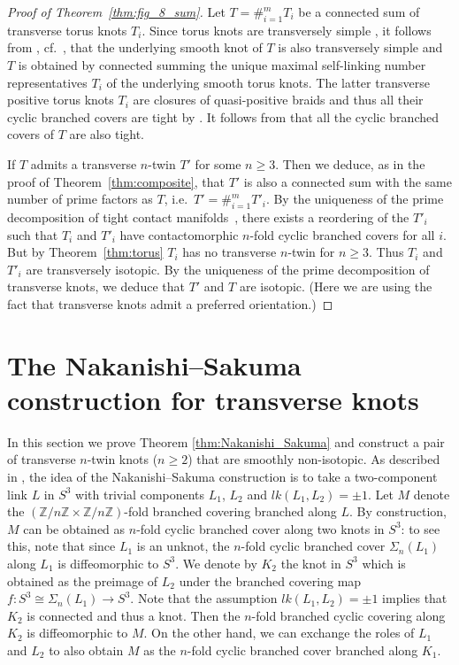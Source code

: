 \documentclass[11pt]{amsart}
\theoremstyle{definition}
\theoremstyle{definition}
\theoremstyle{definition}
\theoremstyle{definition}
\begin{document}
\begin{proof}[Proof of Theorem~\ref{thm:fig_8_sum}]
Let $T=\#_{i=1}^m T_i$ be a connected sum of transverse torus knots $T_i$.
Since torus knots are transversely simple \cite{Etnyre_torus_knots}, it follows from \cite{Etnyre_Honda_sum}, cf.\ \cite{An}, that the underlying smooth knot of $T$ is also transversely simple and $T$ is obtained by connected summing the unique maximal self-linking number representatives $T_i$ of the underlying smooth torus knots. The latter transverse positive torus knots $T_i$ are closures of quasi-positive braids and thus all their cyclic branched covers are tight by \cite{Harvey_br_covers}. It follows from \cite{Colin} that all the cyclic branched covers of $T$ are also tight.

If $T$ admits a transverse $n$-twin $T'$ for some $n\geq3$. Then we deduce, as in the proof of Theorem~\ref{thm:composite}, that $T'$ is also a connected sum with the same number of prime factors as $T$, i.e.\ $T'=\#_{i=1}^m T'_i$. By the uniqueness of the prime decomposition of tight contact manifolds~\cite{Geiges}, there exists a reordering of the $T'_i$ such that $T_i$ and $T'_i$ have contactomorphic $n$-fold cyclic branched covers for all $i$. But by Theorem~\ref{thm:torus} $T_i$ has no transverse $n$-twin for $n\geq3$. Thus $T_i$ and $T'_i$ are transversely isotopic. By the uniqueness of the prime decomposition of transverse knots, we deduce that $T'$ and $T$ are isotopic. (Here we are using the fact that transverse knots admit a preferred orientation.)
\end{proof}

\section{The Nakanishi--Sakuma construction for transverse knots}
In this section we prove Theorem \ref{thm:Nakanishi_Sakuma} and construct a pair of transverse $n$-twin knots ($n\ge 2$) that are smoothly non-isotopic.
As described in \cite{Paoluzzi_survey}, the idea of the Nakanishi--Sakuma construction \cite{nakanishi,sakuma} is to take a two-component link $L $ in $ S^3$ with trivial components $L_1$, $L_2$ and $lk(L_1,L_2)=\pm1$. Let $M$ denote the $(\mathbb{Z}/n\mathbb{Z}\times \mathbb{Z}/n\mathbb{Z})$-fold branched covering branched along $L$. By construction, $M$ can be obtained as $n$-fold cyclic branched cover along two knots in $S^3$: to see this, note that since $L_1$ is an unknot, the $n$-fold cyclic branched cover $\Sigma_n(L_1)$ along $L_1$ is diffeomorphic to $S^3$. We denote by $K_2$ the knot in $S^3$ which is obtained as the preimage of $L_2$ under the branched covering map $f\colon S^3\cong \Sigma_n(L_1)\rightarrow S^3$. Note that the assumption $lk(L_1,L_2)=\pm1$ implies that $K_2$ is connected and thus a knot. Then the $n$-fold branched cyclic covering along $K_2$ is diffeomorphic to $M$. On the other hand, we can exchange the roles of $L_1$ and $L_2$ to also obtain $M$ as the $n$-fold cyclic branched cover branched along $K_1$.
\end{document}

